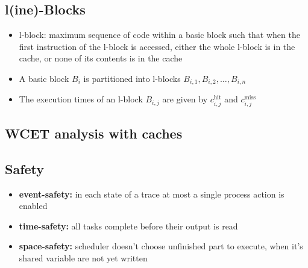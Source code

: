 \documentclass[german]{latex4ei/latex4ei_sheet}
\begin{document}
{\subsection{l(ine)-Blocks}
\begin{itemize}
\item l-block: maximum sequence of code within a basic block such that when the first instruction of the l-block is accessed, either the whole l-block is in the cache, or none of its contents is in the cache
\item A basic block $B_i$ is partitioned into l-blocks $B_{i,1}, B_{i,2},\ldots, B_{i,n}$
\item The execution times of an l-block $B_{i,j}$ are given by $c^\text{hit}_{i,j}$ and $c^\text{miss}_{i,j}$
\end{itemize}

\subsection{WCET analysis with caches}

\subsection{Safety}
\begin{itemize}
\item\textbf{event-safety:} in each state of a trace at most a single process action is enabled
\item\textbf{time-safety:} all tasks complete before their output is read
\item\textbf{space-safety:} scheduler doesn't choose unfinished part to execute, when it's shared variable are not yet written
\end{itemize}
}
\end{document}
